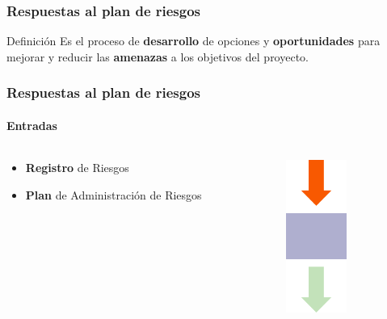 \frame
{
\frametitle{Respuestas al plan de riesgos}

\begin{block}{Definición}
	Es el proceso de \textbf{desarrollo} de opciones y \textbf{oportunidades} para mejorar
	y reducir las \textbf{amenazas} a los objetivos del proyecto.
\end{block}
}

\frame
{
\frametitle{Respuestas al plan de riesgos}
\framesubtitle{Entradas}
\begin{columns}
	\begin{column}{0.8\textwidth}
		\begin{itemize}
			\item <1-> \textbf{Registro} de Riesgos
			\item <2-> \textbf{Plan} de Administración de Riesgos
		\end{itemize}
	\end{column}
	\begin{column}{0.2\textwidth}
		\includegraphics[width=2cm]{img/input}
	\end{column}
\end{columns}
}


